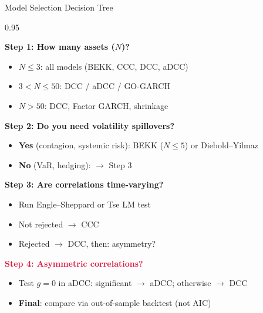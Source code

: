 \documentclass[9pt, aspectratio=169, t]{beamer}
\begin{document}
\begin{frame}{Model Selection Decision Tree}
    \begin{cminipage}{0.95\textwidth}
    \vspace{-3mm}
    {\scriptsize
    \textcolor{MainBlue}{\textbf{Step 1: How many assets ($N$)?}}
    \begin{itemize}\setlength{\itemsep}{0pt}\setlength{\topsep}{0pt}
        \item $N \leq 3$: all models (BEKK, CCC, DCC, aDCC)
        \item $3 < N \leq 50$: DCC / aDCC / GO-GARCH
        \item $N > 50$: DCC, Factor GARCH, shrinkage
    \end{itemize}
    \vspace{-1mm}
    \textcolor{MainBlue}{\textbf{Step 2: Do you need volatility spillovers?}}
    \begin{itemize}\setlength{\itemsep}{0pt}\setlength{\topsep}{0pt}
        \item \textbf{Yes} (contagion, systemic risk): BEKK ($N \leq 5$) or Diebold--Yilmaz
        \item \textbf{No} (VaR, hedging): $\to$ Step 3
    \end{itemize}
    \vspace{-1mm}
    \textcolor{MainBlue}{\textbf{Step 3: Are correlations time-varying?}}
    \begin{itemize}\setlength{\itemsep}{0pt}\setlength{\topsep}{0pt}
        \item Run Engle--Sheppard or Tse LM test
        \item Not rejected $\to$ CCC
        \item Rejected $\to$ DCC, then: asymmetry?
    \end{itemize}
    \vspace{-1mm}
    \textcolor{Crimson}{\textbf{Step 4: Asymmetric correlations?}}
    \begin{itemize}\setlength{\itemsep}{0pt}\setlength{\topsep}{0pt}
        \item Test $g = 0$ in aDCC: significant $\to$ aDCC; otherwise $\to$ DCC
        \item \textbf{Final}: compare via out-of-sample backtest (not AIC)
    \end{itemize}
    }
    \end{cminipage}
\end{frame}
\end{document}
